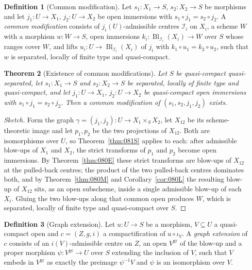 \documentclass[11pt,a4paper]{article}
\theoremstyle{plain}
\newtheorem{theorem}{Theorem}[section]
\theoremstyle{definition}
\newtheorem{definition}[theorem]{Definition}
\theoremstyle{remark}
\newcommand{\Bl}{\operatorname{Bl}}
\newcommand{\sI}{\mathcal{I}}
\newcommand{\qcqs}{quasi-compact quasi-separated}
\begin{document}
\begin{definition}[Common modification]
\label{def:common-modification}
Let $s_1\colon X_1\to S$, $s_2\colon X_2\to S$ be morphisms and let
$j_1\colon U\to X_1$, $j_2\colon U\to X_2$ be open immersions with
$s_1\circ j_1=s_2\circ j_2$. A \emph{common modification} consists of
$j_i(U)$-admissible centres $\sI_i$ on $X_i$, a scheme $W$ with a morphism
$w\colon W\to S$, open immersions $k_i\colon\Bl_{\sI_i}(X_i)\to W$ over $S$
whose ranges cover $W$, and lifts $u_i\colon U\to\Bl_{\sI_i}(X_i)$ of $j_i$
with $k_1\circ u_1=k_2\circ u_2$, such that $w$ is separated, locally of finite
type and quasi-compact.
\end{definition}

\begin{theorem}[Existence of common modifications]
\label{thm:0F3X}
Let $S$ be \qcqs{}, let $s_1\colon X_1\to S$ and $s_2\colon X_2\to S$ be
separated, locally of finite type and quasi-compact, and let $j_1\colon U\to
X_1$, $j_2\colon U\to X_2$ be quasi-compact open immersions with
$s_1\circ j_1=s_2\circ j_2$. Then a common modification of $(s_1,s_2,j_1,j_2)$
exists.
\end{theorem}

\begin{proof}[Sketch]
Form the graph $\gamma=(j_1,j_2)\colon U\to X_1\times_S X_2$, let $X_{12}$ be
its scheme-theoretic image and let $p_1,p_2$ be the two projections of
$X_{12}$. Both are isomorphisms over $U$, so Theorem~\ref{thm:081S} applies to
each: after admissible blow-ups of $X_1$ and $X_2$, the strict transforms of
$p_1$ and $p_2$ become open immersions. By Theorem~\ref{thm:080E} these strict
transforms are blow-ups of $X_{12}$ at the pulled-back centres; the product of
the two pulled-back centres dominates both, and by
Theorem~\ref{thm:080M} and Corollary~\ref{cor:080L} the resulting blow-up of
$X_{12}$ sits, as an open subscheme, inside a single admissible blow-up of each
$X_i$. Gluing the two blow-ups along that common open produces $W$, which is
separated, locally of finite type and quasi-compact over $S$.
\end{proof}

\begin{definition}[Graph extension]
\label{def:proper-extension}
Let $u\colon U\to S$ be a morphism, $V\subseteq U$ a quasi-compact open and
$c=(Z,g,i)$ a compactification of $u\circ\iota_V$. A \emph{graph extension} of
$c$ consists of an $i(V)$-admissible centre on $Z$, an open $V^{\mathrm{gr}}$
of the blow-up and a proper morphism $\psi\colon V^{\mathrm{gr}}\to U$ over $S$
extending the inclusion of $V$, such that $V$ embeds in $V^{\mathrm{gr}}$ as
exactly the preimage $\psi^{-1}V$ and $\psi$ is an isomorphism over $V$.
\end{definition}
\end{document}
